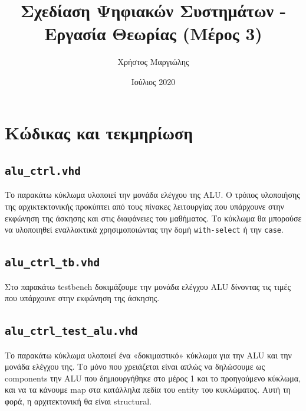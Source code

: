\documentclass{article}
\title{Σχεδίαση Ψηφιακών Συστημάτων - Εργασία Θεωρίας (Μέρος 3)}
\author{Χρήστος Μαργιώλης}
\date{Ιούλιος 2020}
\begin{document}
\begin{titlepage}
        \maketitle
\end{titlepage}

\renewcommand{\contentsname}{Περιεχόμενα}
\tableofcontents

\section{Κώδικας και τεκμηρίωση}

\subsection{\lstinline{alu_ctrl.vhd}}

Το παρακάτω κύκλωμα υλοποιεί την μονάδα ελέγχου της ALU. Ο τρόπος υλοποιήσης
της αρχικτεκτονικής προκύπτει από τους πίνακες λειτουργίας που υπάρχουνε στην
εκφώνηση της άσκησης και στις διαφάνειες του μαθήματος. Το κύκλωμα θα μπορούσε
να υλοποιηθεί εναλλακτικά χρησιμοποιώντας την δομή \lstinline{with-select} ή την
\lstinline{case}. \\


\pagebreak

\subsection{\lstinline{alu_ctrl_tb.vhd}}

Στο παρακάτω testbench δοκιμάζουμε την μονάδα ελέγχου ALU δίνοντας τις τιμές
που υπάρχουνε στην εκφώνηση της άσκησης. \\


\pagebreak

\subsection{\lstinline{alu_ctrl_test_alu.vhd}}

Το παρακάτω κύκλωμα υλοποιεί ένα «δοκιμαστικό» κύκλωμα για την ALU και την μονάδα
ελέγχου της. Το μόνο που χρειάζεται είναι απλώς να δηλώσουμε ως components την ALU
που δημιουργήθηκε στο μέρος 1 και το προηγούμενο κύκλωμα, και να τα κάνουμε
map στα κατάλληλα πεδία του entity του κυκλώματος. Αυτή τη φορά, η αρχιτεκτονική 
θα είναι structural. \\
\end{document}
